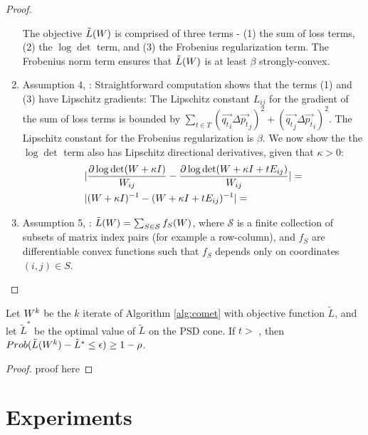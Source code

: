 \documentclass{article}
\begin{document}
\begin{proof}

\begin{enumerate}
The objective $\tilde{L}({W})$ is comprised of three terms - (1) the sum of loss terms, (2) the $\log \det$ term, and (3) the Frobenius regularization term. The Frobenius norm term ensures that $\tilde{L}({W})$ is at least $\beta$ strongly-convex.
\item Assumption 4, \citet{richtarik2013optimal}: Straightforward computation shows that the terms (1) and (3) have Lipschitz gradients: The Lipschitz constant $L_{ij}$ for the gradient of the sum of loss terms is bounded by $\sum_{t \in T} (\vec{{q_t}_i} {\Delta \vec{p_t}}_j)^2 + (\vec{{q_t}_j} {\Delta \vec{p_t}}_i)^2$. The Lipschitz constant for the Frobenius regularization is $\beta$.
We now show the the $\log \det$ term also has Lipschitz directional derivatives, given that $\kappa >0$:
\begin{align}
&| \frac{\partial \log \det (\W + \kappa I)}{\W_{ij}}  - \frac{\partial \log \det (\W + \kappa I + t \E_{ij})}{\W_{ij}}|  = \\
&| (\W + \kappa I)^{-1} - (\W + \kappa I + t\E_{ij})^{-1} | = \\

\end{align}
\item Assumption 5, \citet{richtarik2013optimal}: 
$\tilde{L}({W}) = \sum_{S \in \mathcal{S}} f_S ({W})$, where $\mathcal{S}$ is a finite collection of subsets of matrix index pairs (for example a row-column), and $f_S$ are differentiable convex functions such that $f_S$ depends only on coordinates $(i,j) \in S$.
\end{enumerate}\end{proof}

\begin{corollary}
Let ${W}^k$ be the $k$ iterate of Algorithm \ref{alg:comet} with objective function $\tilde{L}$, and let $\tilde{L}^*$ be the optimal value of $\tilde{L}$ on the PSD cone.
If $t >$ , then $Prob(\tilde{L}({W}^k) - \tilde{L}^* \leq \epsilon) \geq 1-\rho$.
\end{corollary}
\begin{proof}
proof here
\end{proof}
\section{Experiments}
\end{document}
